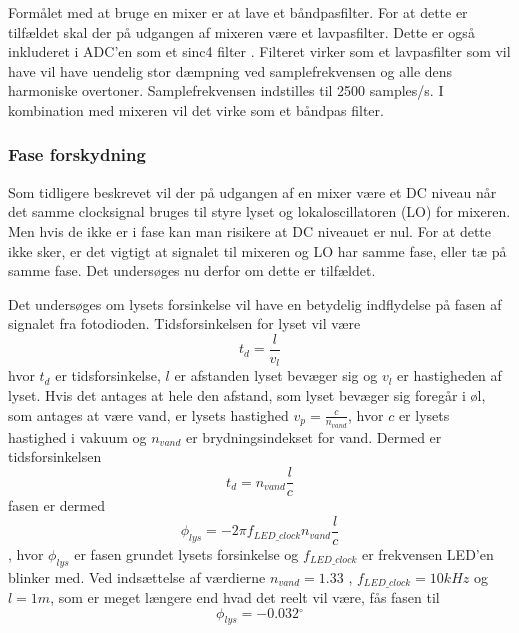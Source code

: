 \documentclass[HardwareDesign/HardwareDesign_main.tex]{subfiles}
\begin{document}
Formålet med at bruge en mixer er at lave et båndpasfilter. For at dette er tilfældet skal der på udgangen af mixeren være et lavpasfilter. Dette er også inkluderet i ADC'en som et sinc4 filter \autocite[35]{ADC_DelSig_datasheet}. Filteret virker som et lavpasfilter som vil have vil have uendelig stor dæmpning ved samplefrekvensen og alle dens harmoniske overtoner. Samplefrekvensen indstilles til 2500 samples/s. I kombination med mixeren vil det virke som et båndpas filter.  

\subsubsection{Fase forskydning}
Som tidligere beskrevet vil der på udgangen af en mixer være et DC niveau når det samme clocksignal bruges til styre lyset og lokaloscillatoren (LO) for mixeren. Men hvis de ikke er i fase kan man risikere at DC niveauet er nul. For at dette ikke sker, er det vigtigt at signalet til mixeren og LO har samme fase, eller tæ på samme fase. Det undersøges nu derfor om dette er tilfældet.

Det undersøges om lysets forsinkelse vil have en betydelig indflydelse på fasen af signalet fra fotodioden. Tidsforsinkelsen for lyset vil være 
$$t_d = \frac{l}{v_l}$$
hvor $t_d$ er tidsforsinkelse, $l$ er afstanden lyset bevæger sig og $v_l$ er hastigheden af lyset. Hvis det antages at hele den afstand, som lyset bevæger sig foregår i øl, som antages at være vand, er lysets hastighed $v_p = \frac{c}{n_{vand}}$, hvor $c$ er lysets hastighed i vakuum og $n_{vand}$ er brydningsindekset for vand.
Dermed er tidsforsinkelsen
$$t_d = n_{vand}\frac{l}{c}$$
fasen er dermed
$$\phi_{lys} = -2 \pi f_{LED\_clock} n_{vand}\frac{l}{c}$$, hvor $\phi_{lys}$ er fasen grundet lysets forsinkelse og $f_{LED\_clock}$ er frekvensen LED'en blinker med. Ved indsættelse af værdierne $n_{vand}=1.33$ \autocite{brydningsindex}, $f_{LED\_clock} = 10kHz$ og $l=1m$, som er meget længere end hvad det reelt vil være, fås fasen til 
$$\phi_{lys} = -0.032 \si{^{\circ}}$$
\end{document}
